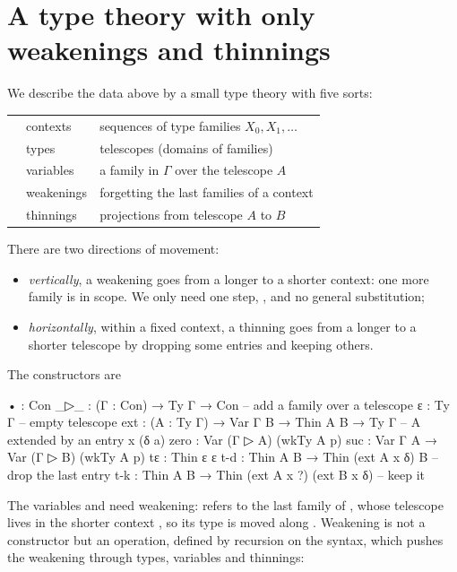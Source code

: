 \documentclass[11pt]{article}
\newcommand{\ag}[1]{\texttt{\detokenize{#1}}}
\begin{document}
\section{A type theory with only weakenings and thinnings}

We describe the data above by a small type theory with five sorts:
\begin{center}
\begin{tabular}{lll}
\toprule
\ag{Con} & contexts & sequences of type families $X_0, X_1, \dots$\\
\ag{Ty Γ} & types & telescopes (domains of families)\\
\ag{Var Γ A} & variables & a family in $\Gamma$ over the telescope $A$\\
\ag{Wk Δ Γ} & weakenings & forgetting the last families of a context\\
\ag{Thin A B} & thinnings & projections from telescope $A$ to $B$\\
\bottomrule
\end{tabular}
\end{center}
There are two directions of movement:
\begin{itemize}
\item \emph{vertically}, a weakening goes from a longer to a shorter context:
  one more family is in scope. We only need one step,
  \ag{p : Wk (Γ ▷ A) Γ}, and no general substitution;
\item \emph{horizontally}, within a fixed context, a thinning goes from a
  longer to a shorter telescope by dropping some entries and keeping others.
\end{itemize}
The constructors are
\begin{agda}
•    : Con
_▷_  : (Γ : Con) → Ty Γ → Con          -- add a family over a telescope
ε    : Ty Γ                            -- empty telescope
ext  : (A : Ty Γ) → Var Γ B → Thin A B → Ty Γ
                                       -- A extended by an entry  x (δ a)
zero : Var (Γ ▷ A) (wkTy A p)
suc  : Var Γ A → Var (Γ ▷ B) (wkTy A p)
tε   : Thin ε ε
t-d  : Thin A B → Thin (ext A x δ) B   -- drop the last entry
t-k  : Thin A B → Thin (ext A x ?) (ext B x δ)   -- keep it
\end{agda}
The variables \ag{zero} and \ag{suc} need weakening: \ag{zero} refers to the
last family of \ag{Γ ▷ A}, whose telescope \ag{A} lives in the shorter context
\ag{Γ}, so its type is \ag{A} moved along \ag{p}. Weakening is not a
constructor but an operation, defined by recursion on the syntax, which
pushes the weakening through types, variables and thinnings:
\end{document}
